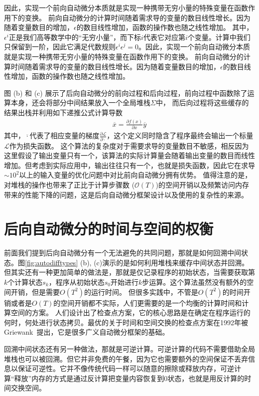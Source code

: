\documentclass[A4,twoside,fontset=ubuntu,UTF8]{ctexart}
\begin{document}
因此，实现一个前向自动微分本质就是实现一种携带无穷小量的特殊变量在函数作用下的变换。
前向自动微分的计算时间随着需求导的变量的数目线性增长。因为随着变量数目的增加，$\epsilon$的数目线性增加，函数的操作数也随之线性增加。
其中，$\epsilon^i$正是我们高等数学中的“无穷小量”，而下标$i$代表它对应第$i$个变量。计算中我们只保留到一阶，因此它满足代数规则$\epsilon^i\epsilon^j = 0$。因此，实现一个前向自动微分本质就是实现一种携带无穷小量的特殊变量在函数作用下的变换。
前向自动微分的计算时间随着需求导的变量的数目线性增长。因为随着变量数目的增加，$\epsilon$的数目线性增加，函数的操作数也随之线性增加。

图 (b) 和 (c) 展示了后向自动微分的前向过程和后向过程，前向过程中函数除了运算本身，还会将部分中间结果放入一个全局堆栈$\Sigma$中，
而后向过程将这些缓存的结果出栈并利用如下递推公式计算导数
\begin{align}
    \overline{x} = \frac{\partial f(x)}{\partial x}\overline{y}
\end{align}
其中，$\overline{\cdot}$代表了相应变量的梯度$\frac{\partial \mathcal{L}}{\partial \cdot}$，这个定义同时隐含了程序最终会输出一个标量$\mathcal{L}$作为损失函数。
这个算法的复杂度对于需要求导的变量数目不敏感，相反因为这里假设了输出变量只有一个，该算法的实际计算量会随着输出变量的数目而线性增加。但考虑到实际应用中，输出往往只有一个，也就是损失函数，因此它在求导$\sim 10^2$以上的输入变量的优化问题中对比前向自动微分拥有优势。
值得注意的是，对堆栈的操作也带来了正比于计算步骤数 ($\mathcal{O}(T)$)的空间开销以及频繁访问内存带来的性能下降的问题，这是后向自动微分框架设计以及使用的复杂性的来源。

\section{后向自动微分的时间与空间的权衡}\label{sec:timespace}

前面我们提到后向自动微分有一个无法避免的共同问题，那就是如何回溯中间状态。图\ref{fig:autodifftypes} (b), (c)演示的是如何利用堆栈来缓存中间状态并回溯。但其实还有一种更加简单的做法是，那就是仅记录程序的初始状态，当需要获取第$k$个计算状态$s_k$，程序从初始状态$s_0$开始进行$k$步运算。这个算法虽然没有额外的空间开销，但是需要$O(T^2)$的运行时间。
但很多实践中，不管是$O(T^2)$的时间开销或者是$O(T)$的空间开销都不实际，人们更需要的是一个均衡的计算时间和计算空间的方案。
人们设计出了检查点方案，它的核心思路是在确定在程序运行的何时，何处进行状态拷贝。最优的关于时间和空间交换的检查点方案在1992年被Griewank~\cite{Griewank1992}提出，它是很多广义自动微分框架的基础。
 
回溯中间状态还有另一种做法，那就是可逆计算。可逆计算的代码不需要借助全局堆栈也可以被回溯。但它并非免费的午餐，因为它也需要额外的空间保证不丢弃信息以保证可逆性。它并不像传统代码一样可以随意的擦除或释放内存，可逆计算“释放”内存的方式是通过反计算把变量内容恢复到0状态，也就是用反计算的时间交换空间。
\end{document}
